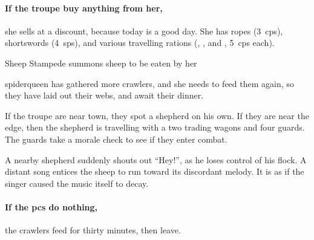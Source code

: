 \paragraph{If the troupe buy anything from her,}
she sells at a discount, because today is a good day.
She has ropes (3~\glspl{cp}), shortswords (4~\glspl{sp}), and various travelling rations (\rations, \rations, and \rations, 5~\glspl{cp} each).


{Sheep Stampede}%
{ summons sheep to be eaten by her }%

\begin{exampletext}
  \Gls{spiderqueen} has gathered more \glspl{crawler}, and she needs to feed them again, so they have laid out their webs, and await their dinner.
\end{exampletext}

If the troupe are near town, they spot a shepherd on his own.
If they are near the \gls{edge}, then the shepherd is travelling with a two trading wagons and four \glspl{guard}. 
The \glspl{guard} take a morale check to see if they enter combat.%


\begin{boxtext}
  A nearby shepherd suddenly shouts out ``Hey!'', as he loses control of his flock.
  A distant song entices the sheep to run toward its discordant melody. It is as if the singer caused the music itself to decay.
\end{boxtext}

\paragraph{If the \glspl{pc} do nothing,}
the \glspl{crawler} feed for thirty minutes, then leave.

